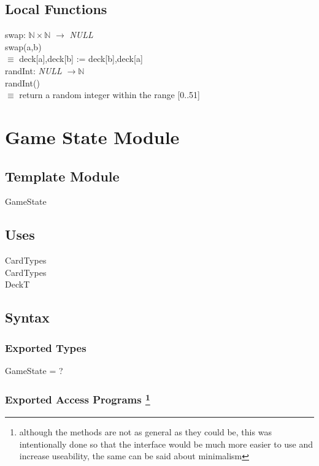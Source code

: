 \documentclass[12pt]{article}
\begin{document}
\subsection* {Local Functions}

\noindent swap: $\mathbb{N} \times \mathbb{N}$  $\rightarrow$ \textit{NULL} \\
\noindent swap(a,b) \\
$\equiv$ deck[a],deck[b] := deck[b],deck[a] \\ 

\noindent randInt: \textit{NULL} $\rightarrow \mathbb{N}$  \\
\noindent randInt() \\
$\equiv$ return a random integer within the range [0..51]

\newpage

\section* {Game State Module}

\subsection*{Template Module}

GameState

\subsection* {Uses}

CardTypes \\
CardTypes\\
DeckT

\subsection* {Syntax}

\subsubsection* {Exported Types}

GameState = ?

\subsubsection* {Exported Access Programs \footnote{although the methods are not as general as they could be, this was intentionally done so that the interface would be much more easier to use and increase useability, the same can be said about minimalism}}
\end{document}
